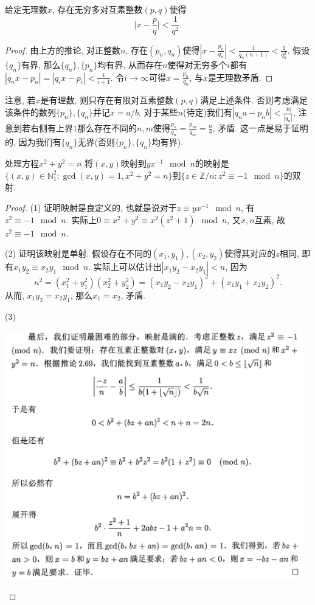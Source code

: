 \begin{corollary}{}
	给定无理数$x$, 存在无穷多对互素整数$(p,q)$使得$$\big| x - \frac{p}{q} \big| < \frac{1}{q^2}.$$
\end{corollary}
\begin{proof}
	由上方的推论, 对正整数$n$, 存在$(p_n,q_n)$使得$|x-\frac{p_n}{q_n}| < \frac{1}{q_n(n+1)} < \frac{1}{q_n^2}$. 假设$\{ q_n \}$有界, 那么$\{ q_n \},\{ p_n \}$均有界, 从而存在$n$使得对无穷多个$i$都有$|q_nx-p_n| = |q_ix-p_i| < \frac{1}{i+1}$. 令$i \to \infty$可得$x=\frac{p_n}{q_n}$, 与$x$是无理数矛盾. 
\end{proof}

注意, 若$x$是有理数, 则只存在有限对互素整数$(p,q)$满足上述条件. 否则考虑满足该条件的数列$\{ p_n \},\{ q_n \}$并记$x=a/b$. 对于某些$n$(待定)我们有$|q_na-p_nb|<\frac{|b|}{|q_n|}$, 注意到若右侧有上界$1$那么存在不同的$n,m$使得$\frac{p_n}{q_n}=\frac{p_m}{q_m}=\frac{a}{b}$, 矛盾. 这一点是易于证明的, 因为我们有$\{ q_n \}$无界(否则$\{ p_n \},\{ q_n \}$均有界). 


\begin{theorem}{处理方程$x^2+y^2=n$}
	将$(x,y)$映射到$yx^{-1} \mod n$的映射是$\{ (x,y) \in \mathbb{N}_1^2:\gcd (x,y)=1, x^2+y^2=n \}$到$\{ z \in \mathbb{Z}/n : z^2 \equiv -1 \mod n \}$的双射. 
\end{theorem}
\begin{proof}
	(1) 证明映射是良定义的, 也就是说对于$z \equiv yx^{-1}  \mod n$, 有$z^2 \equiv -1 \mod n$. 实际上$0 \equiv x^2+y^2 \equiv x^2(z^2+1) \mod n$, 又$x,n$互素, 故$z^2 \equiv -1 \mod n$. 
	
	(2) 证明该映射是单射. 假设存在不同的$(x_1,y_1),(x_2,y_2)$使得其对应的$z$相同, 即有$x_1y_2 \equiv x_2y_1 \mod n$. 实际上可以估计出$|x_1y_2-x_2y_1|<n$, 因为$$n^2 = (x_1^2+y_1^2)(x_2^2+y_2^2) = (x_1y_2-x_2y_1)^2 + (x_1y_1+x_2y_2)^2.$$
	从而, $x_1y_2=x_2y_1$, 那么$x_1 = x_2$, 矛盾.
	
	(3) 
	
	\begin{center}
		\includegraphics[width=13cm]{attachment/iShot_2024-01-06_21.42.59.png}
	\end{center}
	 
\end{proof}

